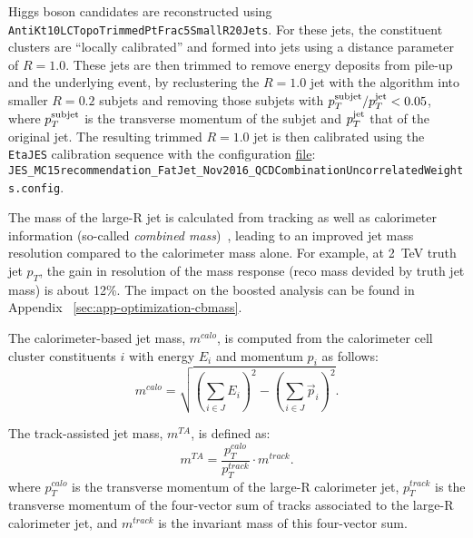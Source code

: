 Higgs boson candidates are reconstructed using \\
 \verb|AntiKt10LCTopoTrimmedPtFrac5SmallR20Jets|. 
 For these jets, the constituent clusters are ``locally calibrated'' \cite{Aad:2011he} and formed into jets using a distance parameter of $R=1.0$. These jets are then trimmed \cite{Krohn2010} to remove energy deposits from pile-up and the underlying event, by reclustering the $R=1.0$ jet with the \kt algorithm into smaller $R=0.2$ subjets and removing those subjets with $p_{T}^{\rm{subjet}}/p_{T}^{\rm{jet}} < 0.05$, where $p_{T}^{\rm{subjet}}$ is the transverse momentum of the subjet and $p_{T}^{\rm{jet}}$ that of the original jet. The resulting trimmed $R=1.0$ jet is then calibrated using the \verb|EtaJES| calibration sequence with the configuration \href{https://twiki.cern.ch/twiki/bin/view/AtlasProtected/ApplyJetCalibration2016}{file}: \\ \verb|JES_MC15recommendation_FatJet_Nov2016_QCDCombinationUncorrelatedWeights.config|.

The mass of the large-R jet is calculated from tracking as well as calorimeter information (so-called \emph{combined mass})~\cite{ATLAS-CONF-2016-035}, leading to an improved jet mass resolution compared to the calorimeter mass alone. For example, at 2~TeV truth jet $p_T$, the gain in resolution of the mass response (reco mass devided by truth jet mass) is about 12\%. The impact on the boosted analysis can be found in Appendix ~\ref{sec:app-optimization-cbmass}.

The calorimeter-based jet mass, $m^{calo}$, is computed from the calorimeter cell cluster constituents $i$ with energy $E_i$ and momentum $p_i$ as follows:
\begin{equation}
m^{calo} = \sqrt{\left(\sum_{i\in J}E_i\right)^2-\left(\sum_{i\in J}\vec{p}_i\right)^2}.
\end{equation}

The track-assisted jet mass, $m^{TA}$, is defined as:
\begin{equation}
m^{TA} = \frac{p_T^{calo}}{p_T^{track}} \cdot m^{track}.
\end{equation}
where $p_{T}^{calo}$ is the transverse momentum of the large-R calorimeter jet, $p_{T}^{track}$ is the transverse momentum of the four-vector sum of tracks associated to the large-R calorimeter jet, and $m^{track}$ is the invariant mass of this four-vector sum.

